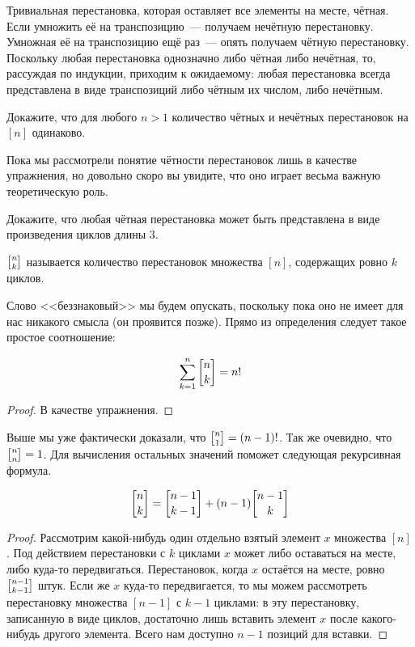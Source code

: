 Тривиальная перестановка, которая оставляет все элементы на месте, чётная. Если умножить её на транспозицию~--- получаем нечётную перестановку. Умножная её на транспозицию ещё раз~--- опять получаем чётную перестановку. Поскольку любая перестановка однозначно либо чётная либо нечётная, то, рассуждая по индукции, приходим к ожидаемому: любая перестановка всегда представлена в виде транспозиций либо чётным их числом, либо нечётным.

\begin{exercise}
Докажите, что для любого $n>1$ количество чётных и нечётных перестановок на $[n]$ одинаково.
\end{exercise}

Пока мы рассмотрели понятие чётности перестановок лишь в качестве упражнения, но довольно скоро вы увидите, что оно играет весьма важную теоретическую роль.

\begin{exercise}
Докажите, что любая чётная перестановка может быть представлена в виде произведения циклов длины 3.
\end{exercise}

\begin{definition}
 $\fstirling{n}{k}$ называется количество перестановок множества $[n]$, содержащих ровно $k$ циклов.
\end{definition}

Слово <<беззнаковый>> мы будем опускать, поскольку пока оно не имеет для нас никакого смысла (он проявится позже). Прямо из определения следует такое простое соотношение:

\begin{thm}
$$\sum_{k=1}^n \fstirling{n}{k} = n!$$
\end{thm}
\begin{proof}
В качестве упражнения.
\end{proof}

Выше мы уже фактически доказали, что $\fstirling{n}{1} = (n-1)!$. Так же очевидно, что $\fstirling{n}{n} = 1$. Для вычисления остальных значений поможет следующая рекурсивная формула.

\begin{thm}
$$\fstirling{n}{k} = \fstirling{n-1}{k-1} + (n-1)\fstirling{n-1}{k}$$
\end{thm}
\begin{proof}
Рассмотрим какой-нибудь один отдельно взятый элемент $x$ множества $[n]$. Под действием перестановки с $k$ циклами $x$ может либо оставаться на месте, либо куда-то передвигаться. Перестановок, когда $x$ остаётся на месте, ровно $\fstirling{n-1}{k-1}$ штук. Если же $x$ куда-то передвигается, то мы можем рассмотреть перестановку множества $[n-1]$ с $k-1$ циклами: в эту перестановку, записанную в виде циклов, достаточно лишь вставить элемент $x$ после какого-нибудь другого элемента. Всего нам доступно $n-1$ позиций для вставки.
\end{proof}

